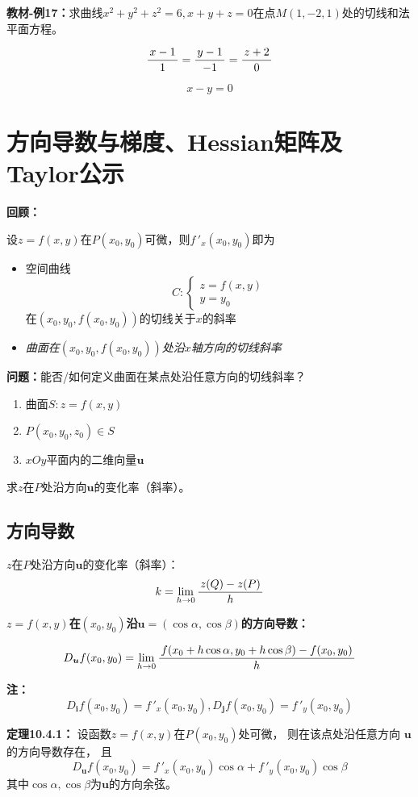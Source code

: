 {\bf 教材-例17：}求曲线$x^2+y^2+z^2=6,x+y+z=0$在点$M(1,-2,1)$处的切线和法平面方程。

$$\displaystyle\frac{\,{x-1}\,}{\,{1}\,}=\displaystyle\frac{\,{y-1}\,}{\,{-1}\,}=\displaystyle\frac{\,{z+2}\,}{\,{0}\,}$$

$$x-y=0$$

\section{方向导数与梯度、Hessian矩阵及Taylor公示}

{\bf 回顾：}

设$z=f(x,y)$在$P(x_0,y_0)$可微，则$f\,'_x(x_0,y_0)$即为
\begin{itemize}
  \item 空间曲线
  $$C:\left\{\begin{array}{l}
  	z=f(x,y)\\ y=y_0
  \end{array}\right.$$
  在$(x_0,y_0,f(x_0,y_0))$的切线关于$x$的斜率
  \item {\it 曲面在$(x_0,y_0,f(x_0,y_0))$处沿$x$轴方向的切线斜率}
\end{itemize}

{\bf 问题：}能否/如何定义曲面在某点处沿任意方向的切线斜率？

\begin{enumerate}[(1)]
  \setlength{\itemindent}{1cm}
  \item 曲面$S:z=f(x,y)$ 
  \item $P(x_0,y_0,z_0)\in S$ 
  \item $xOy$平面内的二维向量$\bm{u}$ 
\end{enumerate}
求$z$在$P$处沿方向$\bm{u}$的变化率（斜率）。

\subsection{方向导数}

$z$在$P$处沿方向$\bm{u}$的变化率（斜率）： 
$$k=\lim\limits_{h\to 0}\displaystyle\frac{\,{z(Q)-z(P)}\,}{\,{h}\,}$$

{\bf $z=f(x,y)$在$(x_0,y_0)$沿$\bm{u}=(\cos\alpha,\cos\beta)$的方向导数：}

$${D_{\bm{u}}f(x_0,y_0)=\lim\limits_{h\to 0}
\displaystyle\frac{\,{f(x_0+h\cos\alpha,y_0+h\cos\beta)-f(x_0,y_0)}\,}{\,{h}\,}}$$

{\bf 注：}$$D_{\bm{i}}f(x_0,y_0)=f\,'_x(x_0,y_0),
D_{\bm{j}}f(x_0,y_0)=f\,'_y(x_0,y_0)$$

{\bf 定理10.4.1：}
设函数$z=f(x,y)$在$P(x_0,y_0)$处可微， 则在该点处沿任意方向
$\bm{u}$的方向导数存在， 且
$$D_{\bm{u}}f(x_0,y_0) =f\,'_x(x_0,y_0)\cos\alpha+f\,'_y(x_0,y_0)\cos\beta$$
其中$\cos\alpha,\cos\beta$为$\bm{u}$的方向余弦。

